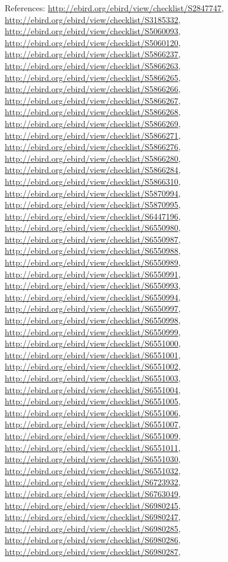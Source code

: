 \documentclass[9pt, article]{memoir}
\begin{document}
\begin{multicols}{2}
References: 
\url{http://ebird.org/ebird/view/checklist/S2847747}, 
\url{http://ebird.org/ebird/view/checklist/S3185332}, 
\url{http://ebird.org/ebird/view/checklist/S5060093}, 
\url{http://ebird.org/ebird/view/checklist/S5060120}, 
\url{http://ebird.org/ebird/view/checklist/S5866237}, 
\url{http://ebird.org/ebird/view/checklist/S5866263}, 
\url{http://ebird.org/ebird/view/checklist/S5866265}, 
\url{http://ebird.org/ebird/view/checklist/S5866266}, 
\url{http://ebird.org/ebird/view/checklist/S5866267}, 
\url{http://ebird.org/ebird/view/checklist/S5866268}, 
\url{http://ebird.org/ebird/view/checklist/S5866269}, 
\url{http://ebird.org/ebird/view/checklist/S5866271}, 
\url{http://ebird.org/ebird/view/checklist/S5866276}, 
\url{http://ebird.org/ebird/view/checklist/S5866280}, 
\url{http://ebird.org/ebird/view/checklist/S5866284}, 
\url{http://ebird.org/ebird/view/checklist/S5866310}, 
\url{http://ebird.org/ebird/view/checklist/S5870994}, 
\url{http://ebird.org/ebird/view/checklist/S5870995}, 
\url{http://ebird.org/ebird/view/checklist/S6447196}, 
\url{http://ebird.org/ebird/view/checklist/S6550980}, 
\url{http://ebird.org/ebird/view/checklist/S6550987}, 
\url{http://ebird.org/ebird/view/checklist/S6550988}, 
\url{http://ebird.org/ebird/view/checklist/S6550989}, 
\url{http://ebird.org/ebird/view/checklist/S6550991}, 
\url{http://ebird.org/ebird/view/checklist/S6550993}, 
\url{http://ebird.org/ebird/view/checklist/S6550994}, 
\url{http://ebird.org/ebird/view/checklist/S6550997}, 
\url{http://ebird.org/ebird/view/checklist/S6550998}, 
\url{http://ebird.org/ebird/view/checklist/S6550999}, 
\url{http://ebird.org/ebird/view/checklist/S6551000}, 
\url{http://ebird.org/ebird/view/checklist/S6551001}, 
\url{http://ebird.org/ebird/view/checklist/S6551002}, 
\url{http://ebird.org/ebird/view/checklist/S6551003}, 
\url{http://ebird.org/ebird/view/checklist/S6551004}, 
\url{http://ebird.org/ebird/view/checklist/S6551005}, 
\url{http://ebird.org/ebird/view/checklist/S6551006}, 
\url{http://ebird.org/ebird/view/checklist/S6551007}, 
\url{http://ebird.org/ebird/view/checklist/S6551009}, 
\url{http://ebird.org/ebird/view/checklist/S6551011}, 
\url{http://ebird.org/ebird/view/checklist/S6551030}, 
\url{http://ebird.org/ebird/view/checklist/S6551032}, 
\url{http://ebird.org/ebird/view/checklist/S6723932}, 
\url{http://ebird.org/ebird/view/checklist/S6763049}, 
\url{http://ebird.org/ebird/view/checklist/S6980245}, 
\url{http://ebird.org/ebird/view/checklist/S6980247}, 
\url{http://ebird.org/ebird/view/checklist/S6980285}, 
\url{http://ebird.org/ebird/view/checklist/S6980286}, 
\url{http://ebird.org/ebird/view/checklist/S6980287}, 

\end{multicols}
\end{document}

